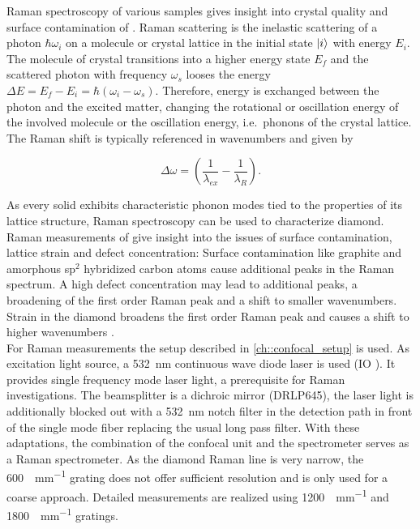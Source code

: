 			Raman spectroscopy of various samples gives insight into crystal quality and surface contamination of \nds.
			Raman scattering is the inelastic scattering of a photon $\hbar\omega_i$ on a molecule or crystal lattice in the initial state $\ket{i}$ with energy $E_i$.
			The molecule of crystal transitions into a higher energy state $E_f$ and the scattered photon with frequency $\omega_s$ looses the energy $\Delta E = E_f - E_i = \hbar(\omega_i-\omega_s)$.
			Therefore, energy is exchanged between the photon and the excited matter, changing the rotational or oscillation energy of the involved molecule or the oscillation energy, i.e.\ phonons of the crystal lattice.
			The Raman shift is typically referenced in wavenumbers and given by

			\begin{equation}
				\Delta \omega = \left( \frac{1}{\lambda_{ex}}-\frac{1}{\lambda_R}\right).
			\end{equation}

			As every solid exhibits characteristic phonon modes tied to the properties of its lattice structure, Raman spectroscopy can be used to characterize diamond.
			Raman measurements of \nds give insight into the issues of surface contamination, lattice strain and defect concentration:
			Surface contamination like graphite and amorphous sp$^2$ hybridized carbon atoms cause additional peaks in the Raman spectrum.
			A high defect concentration may lead to additional peaks, a broadening of the first order Raman peak and a shift to smaller wavenumbers.
			Strain in the diamond broadens the first order Raman peak and causes a shift to higher wavenumbers \cite{Zaitsev2001,Prawer2004,Orwa2000}.
			\\
			For Raman measurements the setup described in \autoref{ch::confocal_setup} is used.
			As excitation light source, a \SI{532}{nm} continuous wave diode laser is used (IO ).
			It provides single frequency mode laser light, a prerequisite for Raman investigations.
			The beamsplitter is a dichroic mirror (DRLP645), the laser light is additionally blocked out with a \SI{532}{\nm} notch filter in the detection path in front of the single mode fiber replacing the usual long pass filter.
			With these adaptations, the combination of the confocal unit and the spectrometer serves as a Raman spectrometer.
			As the diamond Raman line is very narrow, the \SI[per-mode=symbol]{600}{\lines\per\mm} grating does not offer sufficient resolution and is only used for a coarse approach. Detailed measurements are realized using \SI[per-mode=symbol]{1200}{\lines\per\mm} and \SI[per-mode=symbol]{1800}{\lines\per\mm} gratings.
			\\

